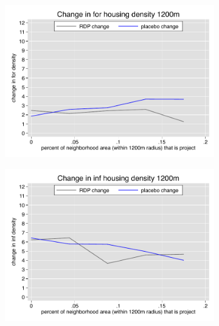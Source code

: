 \documentclass[12pt]{article}
\begin{document}
\begin{figure}
\begin{subfigure}[b]{0.495\textwidth}
        \end{subfigure}
        \vspace{-6mm}
        \begin{subfigure}[b]{0.495\textwidth}
            \centering
            \includegraphics[width=\textwidth,trim={0.3cm .3cm 0.1cm 0cm}, clip=true]{figures/change_for_1200_total.pdf}
        \end{subfigure}
        \hfill
        \begin{subfigure}[b]{0.495\textwidth}  
            \centering 
            \includegraphics[width=\textwidth,trim={0.3cm .3cm 0.1cm 0cm}, clip=true]{figures/change_inf_1200_total.pdf}
        \end{subfigure}
        \vspace{-6mm}
    \end{figure} 
\end{document}

